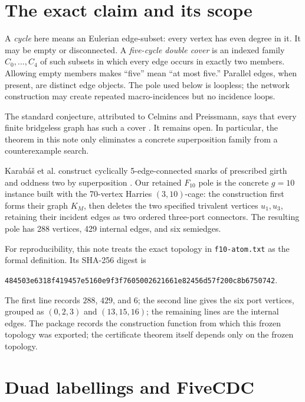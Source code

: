 \documentclass[11pt]{article}
\theoremstyle{definition}
\theoremstyle{remark}
\numberwithin{equation}{section}
\begin{document}
\section{The exact claim and its scope}

A \emph{cycle} here means an Eulerian edge-subset: every vertex has even
degree in it.  It may be empty or disconnected.  A \emph{five-cycle double
cover} is an indexed family \(C_0,\ldots,C_4\) of such subsets in which
every edge occurs in exactly two members.  Allowing empty members makes
``five'' mean ``at most five.''  Parallel edges, when present, are distinct
edge objects.  The pole used below is loopless; the network construction
may create repeated macro-incidences but no incidence loops.

The standard conjecture, attributed to Celmins and Preissmann, says that
every finite bridgeless graph has such a cover \cite{LiuEtAl2023}.  It
remains open.  In particular, the theorem in this note only eliminates a
concrete superposition family from a counterexample search.

Karab\'a\v{s} et al. construct cyclically 5-edge-connected snarks of
prescribed girth and oddness two by superposition
\cite[Theorem~5.1]{KarabasEtAl2022}.  Our retained \(F_{10}\) pole is the
concrete \(g=10\) instance built with the 70-vertex Harries \((3,10)\)-cage:
the construction first forms their graph \(K_M\), then deletes the two
specified trivalent vertices \(u_1,u_3\), retaining their incident edges
as two ordered three-port connectors.  The resulting pole has 288 vertices,
429 internal edges, and six semiedges.

For reproducibility, this note treats the exact topology in
\texttt{f10-atom.txt} as the formal definition.  Its SHA-256 digest is
\begin{center}
\small\texttt{484503e6318f419457e5160e9f3f7605002621661e82456d57f200c8b6750742}.
\end{center}
The first line records \(288\), \(429\), and \(6\); the second line gives
the six port vertices, grouped as \((0,2,3)\) and \((13,15,16)\); the
remaining lines are the internal edges.  The package records the
construction function from which this frozen topology was exported; the
certificate theorem itself depends only on the frozen topology.

\section{Duad labellings and FiveCDC}
\end{document}
